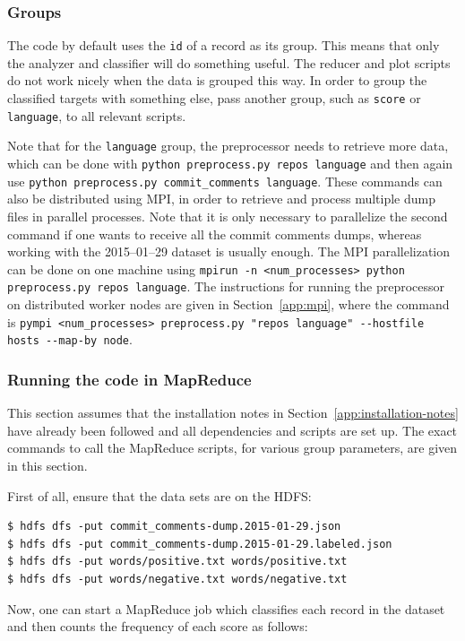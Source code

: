 \documentclass{article}
\begin{document}
\subsubsection{Groups}\label{app:groups}
The code by default uses the \texttt{id} of a record as its group. This means 
that only the analyzer and classifier will do something useful. The reducer and 
plot scripts do not work nicely when the data is grouped this way. In order to 
group the classified targets with something else, pass another group, such as 
\texttt{score} or \texttt{language}, to all relevant scripts.

Note that for the \texttt{language} group, the preprocessor needs to retrieve 
more data, which can be done with \texttt{python preprocess.py repos language} 
and then again use \texttt{python preprocess.py commit\_comments language}. 
These commands can also be distributed using MPI, in order to retrieve and 
process multiple dump files in parallel processes. Note that it is only 
necessary to parallelize the second command if one wants to receive all the 
commit comments dumps, whereas working with the 2015--01--29 dataset is 
usually enough. The MPI parallelization can be done on one machine using 
\texttt{mpirun -n <num\_processes> python preprocess.py 
repos language}. The instructions for running the preprocessor on distributed 
worker nodes are given in Section~\ref{app:mpi}, where the command is 
\texttt{pympi <num\_processes> preprocess.py "repos 
language" -{}-hostfile hosts -{}-map-by node}.

\subsubsection{Running the code in MapReduce}\label{app:mapreduce}
This section assumes that the installation notes in 
Section~\ref{app:installation-notes} have already been followed and all 
dependencies and scripts are set up. The exact commands to call the MapReduce 
scripts, for various group parameters, are given in this section.

First of all, ensure that the data sets are on the HDFS:

\begin{verbatim}
$ hdfs dfs -put commit_comments-dump.2015-01-29.json
$ hdfs dfs -put commit_comments-dump.2015-01-29.labeled.json
$ hdfs dfs -put words/positive.txt words/positive.txt
$ hdfs dfs -put words/negative.txt words/negative.txt
\end{verbatim}

Now, one can start a MapReduce job which classifies each record in the dataset 
and then counts the frequency of each score as follows:
\end{document}
